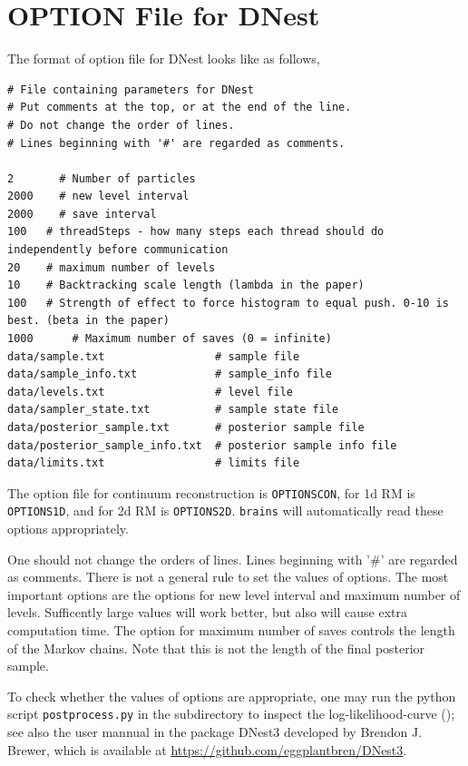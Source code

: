 \documentclass[oneside]{book}
\begin{document}
\section{OPTION File for DNest}
The format of option file for DNest looks like as follows,
\begin{shaded}
\scriptsize
\begin{verbatim}
# File containing parameters for DNest
# Put comments at the top, or at the end of the line.
# Do not change the order of lines.
# Lines beginning with '#' are regarded as comments.

2	    # Number of particles
2000	# new level interval
2000	# save interval
100	  # threadSteps - how many steps each thread should do independently before communication
20	  # maximum number of levels
10	  # Backtracking scale length (lambda in the paper)
100	  # Strength of effect to force histogram to equal push. 0-10 is best. (beta in the paper)
1000	  # Maximum number of saves (0 = infinite)
data/sample.txt                 # sample file
data/sample_info.txt            # sample_info file
data/levels.txt                 # level file
data/sampler_state.txt          # sample state file
data/posterior_sample.txt       # posterior sample file
data/posterior_sample_info.txt  # posterior sample info file
data/limits.txt                 # limits file
\end{verbatim}
\end{shaded}

The option file for continuum reconstruction is \texttt{OPTIONSCON}, for 1d RM is \texttt{OPTIONS1D}, and 
for 2d RM is \texttt{OPTIONS2D}. \texttt{brains} will automatically read these options appropriately. 

One should not change the orders of lines. Lines beginning with '\#' are regarded as comments. 
There is not a general rule to set the values of options. The most important options are the options 
for new level interval and maximum number of levels. Sufficently large values will work better, but also
will cause extra computation time. The option for maximum number of saves controls the length of the 
Markov chains. Note that this is not the length of the final posterior sample. 

To check whether the values of options are appropriate, one may run the python script \texttt{postprocess.py}
in the subdirectory to inspect the log-likelihood-curve (\citealt{Brewer2011}); see also the user mannual in the 
package DNest3 developed by Brendon J. Brewer, which is available at \url{https://github.com/eggplantbren/DNest3}. 
\end{document}
